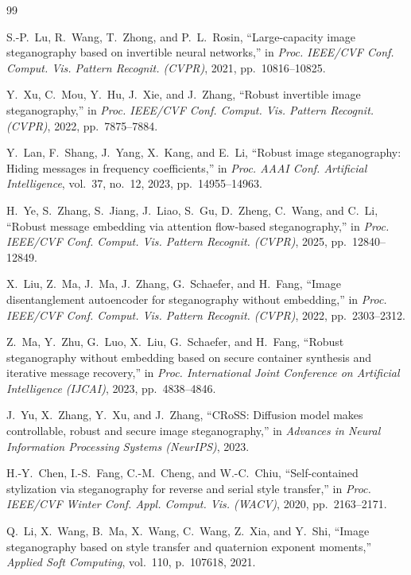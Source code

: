 \documentclass[conference]{IEEEtran}
\begin{document}
\begin{thebibliography}{99}

S.-P.\ Lu, R.\ Wang, T.\ Zhong, and P.~L.\ Rosin, ``Large-capacity image steganography based on invertible neural networks,'' in \emph{Proc. IEEE/CVF Conf. Comput. Vis. Pattern Recognit. (CVPR)}, 2021, pp.\ 10816--10825.

Y.\ Xu, C.\ Mou, Y.\ Hu, J.\ Xie, and J.\ Zhang, ``Robust invertible image steganography,'' in \emph{Proc. IEEE/CVF Conf. Comput. Vis. Pattern Recognit. (CVPR)}, 2022, pp.\ 7875--7884.

Y.\ Lan, F.\ Shang, J.\ Yang, X.\ Kang, and E.\ Li, ``Robust image steganography: Hiding messages in frequency coefficients,'' in \emph{Proc. AAAI Conf. Artificial Intelligence}, vol.\ 37, no.\ 12, 2023, pp.\ 14955--14963.

H.\ Ye, S.\ Zhang, S.\ Jiang, J.\ Liao, S.\ Gu, D.\ Zheng, C.\ Wang, and C.\ Li, ``Robust message embedding via attention flow-based steganography,'' in \emph{Proc. IEEE/CVF Conf. Comput. Vis. Pattern Recognit. (CVPR)}, 2025, pp.\ 12840--12849.

X.\ Liu, Z.\ Ma, J.\ Ma, J.\ Zhang, G.\ Schaefer, and H.\ Fang, ``Image disentanglement autoencoder for steganography without embedding,'' in \emph{Proc. IEEE/CVF Conf. Comput. Vis. Pattern Recognit. (CVPR)}, 2022, pp.\ 2303--2312.

Z.\ Ma, Y.\ Zhu, G.\ Luo, X.\ Liu, G.\ Schaefer, and H.\ Fang, ``Robust steganography without embedding based on secure container synthesis and iterative message recovery,'' in \emph{Proc. International Joint Conference on Artificial Intelligence (IJCAI)}, 2023, pp.\ 4838--4846.

J.\ Yu, X.\ Zhang, Y.\ Xu, and J.\ Zhang, ``CRoSS: Diffusion model makes controllable, robust and secure image steganography,'' in \emph{Advances in Neural Information Processing Systems (NeurIPS)}, 2023.

H.-Y.\ Chen, I.-S.\ Fang, C.-M.\ Cheng, and W.-C.\ Chiu, ``Self-contained stylization via steganography for reverse and serial style transfer,'' in \emph{Proc. IEEE/CVF Winter Conf. Appl. Comput. Vis. (WACV)}, 2020, pp.\ 2163--2171.

Q.\ Li, X.\ Wang, B.\ Ma, X.\ Wang, C.\ Wang, Z.\ Xia, and Y.\ Shi, ``Image steganography based on style transfer and quaternion exponent moments,'' \emph{Applied Soft Computing}, vol.\ 110, p.\ 107618, 2021.


\end{thebibliography}
\end{document}
